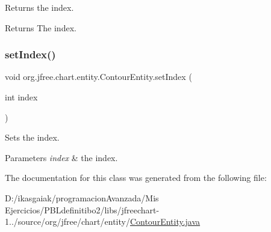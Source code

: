 Returns the index.

\begin{DoxyReturn}{Returns}
The index. 
\end{DoxyReturn}
\mbox{\label{classorg_1_1jfree_1_1chart_1_1entity_1_1_contour_entity_ab1b1b899f14d3a67cd7dc76e972979f9}} 
\subsubsection{\texorpdfstring{set\+Index()}{setIndex()}}
{\footnotesize\ttfamily void org.\+jfree.\+chart.\+entity.\+Contour\+Entity.\+set\+Index (\begin{DoxyParamCaption}\item[{int}]{index }\end{DoxyParamCaption})}

Sets the index.


\begin{DoxyParams}{Parameters}
{\em index} & the index. \\
\hline
\end{DoxyParams}


The documentation for this class was generated from the following file\+:\begin{DoxyCompactItemize}
\item 
D\+:/ikasgaiak/programacion\+Avanzada/\+Mis Ejercicios/\+P\+B\+Ldefinitibo2/libs/jfreechart-\/1../source/org/jfree/chart/entity/\mbox{\hyperlink{_contour_entity_8java}{Contour\+Entity.\+java}}\end{DoxyCompactItemize}
